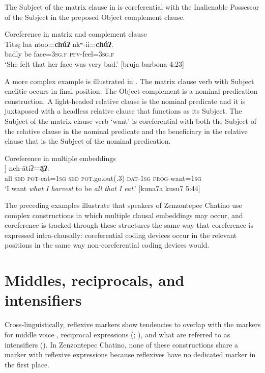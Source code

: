 \documentclass[output=paper]{../langscibook}
\begin{document}
The Subject of the matrix clause in  is coreferential with the Inalienable Possessor of the Subject in the preposed Object complement clause.


\ea\label{ex:campbell:38}
{Coreference in matrix and complement clause}\\
\gll Titsę  laa  ntoo\textbf{=chúʔ}  nkʷ-ii\textbf{=chúʔ}.\\
     badly  be  face=\textsc{3sg.f}  \textsc{pfv}{}-feel=\textsc{3sg.f}\\
\glt ‘She felt that her face was very bad.’ [bruja barbona 4:23]
\z


A more complex example is illustrated in . The matrix clause verb with Subject enclitic occurs in final position. The Object complement is a nominal predication construction. A light-headed relative clause is the nominal predicate and it is juxtaposed with a headless relative clause that functions as its Subject. The Subject of the matrix clause verb ‘want’ is coreferential with both the Subject of the relative clause in the nominal predicate and the beneficiary in the relative clause that is the Subject of the nominal predication.


\ea\label{ex:campbell:39}
{Coreference in multiple embeddings}\\
\gll [[Tatīyá  nu  k-aku\textbf{=ą̄ʔ}]  [nu  tyúʔu  jy\textbf{{}-\'{ą}ʔ}]]  nch-ātíʔ\textbf{=ą̄ʔ}.\\
     all  \textsc{sbd}  \textsc{pot}{}-eat=\textsc{1sg}  \textsc{sbd}  \textsc{pot}.go.out(.3)  \textsc{dat}{}-\textsc{1sg}  \textsc{prog}{}-want=\textsc{1sg}\\
\glt ‘I want \textit{what I harvest} to be \textit{all that I eat}.’ [kuna7a kusu7 5:44]
\z


The preceding examples illustrate that speakers of Zenzontepec Chatino use complex constructions in which multiple clausal embeddings may occur, and coreference is tracked through these structures the same way that coreference is expressed intra-clausally: coreferential coding devices occur in the relevant positions in the same way non-coreferential coding devices would.


\section{Middles, reciprocals, and intensifiers}
\label{sec:campbell:5}

Cross-linguistically, reflexive markers show tendencies to overlap with the markers for middle voice \citep{Kemmer1993}, reciprocal expressions (\citealt{Maslova2008}; \citealt{HeineMiyashita2008}), and what are referred to as intensifiers (\citealt{KoenigSiemund1999}). In Zenzontepec Chatino, none of these constructions share a marker with reflexive expressions because reflexives have no dedicated marker in the first place.
\end{document}
